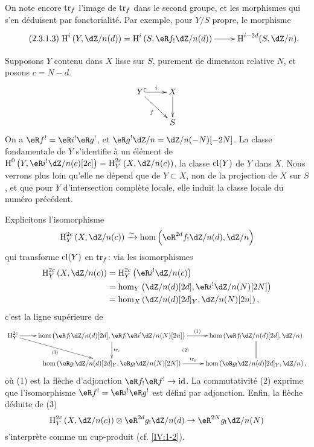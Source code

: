 On note encore $\operatorname{tr}_f$ l'image de $\operatorname{tr}_f$ dans le second groupe, et les 
morphismes qui s'en déduisent par fonctorialité. Par exemple, pour $Y/S$ 
propre, le morphisme 
\begin{equation*}\tag{2.3.1.3}\label{IV:eq:2-3-1-3}
\xymatrix{
  \h^i\left(Y,\dZ/n(d)\right) = \h^i\left(S,\eR f_!\dZ/n(d)\right) \ar[r] 
    & \h^{i-2 d}(S,\dZ/n) \text{.}
}
\end{equation*}

Supposons $Y$ contenu dans $X$ lisse sur $S$, purement de dimension relative 
$N$, et posons $c=N-d$. 
\[\xymatrix{
  Y \ar@{^{(}->}[r]^-i \ar[dr]_-f 
    & X \ar[d] \\
  & S
}\]
On a $\eR f^! = \eR i^!\eR g^!$, et $\eR g^! \dZ/n=\dZ/n(-N)[-2 N]$. La classe 
fondamentale de $Y$ s'identifie à un élément de 
$\h^0\left(Y,\eR i^!\dZ/n(c)[2 c]\right)=\h_Y^{2 c}\left(X,\dZ/n(c)\right)$, la 
classe $\operatorname{cl}(Y)$ de $Y$ dans $X$. Nous verrons plus loin qu'elle ne dépend que 
de $Y\subset X$, non de la projection de $X$ sur $S$, et que pour $Y$ 
d'intersection complète locale, elle induit la classe locale du numéro 
précédent. 

Explicitons l'isomorphisme 
\[
  \h_Y^{2 c}\left(X,\dZ/n(c)\right) \iso \hom\left(\eR^{2 d}f_!\dZ/n(d),\dZ/n\right)
\]
qui transforme $\operatorname{cl}(Y)$ en $\operatorname{tr}_f$: via les isomorphismes 
\begin{align*}
  \h_Y^{2 c}\left(X,\dZ/n(c)\right) 
    &= \h_Y^{2 c}\left(\eR i^!\dZ/n(c)\right) \\
    &= \hom_Y\left(\dZ/n(d)[2 d],\eR i^!\dZ/n(N)[2 N]\right) \\
    &= \hom_X\left(\dZ/n(d)[2 d]_Y,\dZ/n(N)[2 n]\right) \text{,}
\end{align*}
c'est la ligne supérieure de 
\[\xymatrix{
  \h_Y^{2 c} \ar[r] \ar[dr]_-{(3)} 
    & \hom\left(\eR f_!\dZ/n(d)[2 d],\eR f_! \eR i^!\dZ/n(N)[2 n]\right) \ar[r]^-{(1)} \ar[d]^-{\tr_i} \ar@{}[dr]|-{(2)}
    & \hom\left(\eR f_!\dZ/n(d)[2d],\dZ/n\right) \ar@{=}[d] \\
  & \hom\left(\eR g_!\dZ/n(d)[2 d]_Y,\eR g_!\dZ/n(N)[2 N]\right) \ar[r]^-{\tr_g} 
    & \hom\left(\eR g_!\dZ/n(d)[2 d]_Y,\dZ/n\right) \text{,}
}\]
où (1) est la flèche d'adjonction $\eR f_!\eR f^!\to \text{id}$. La 
commutativité (2) exprime que l'isomorphisme $\eR f^!=\eR i^!\eR g^!$ est 
défini par adjonction. Enfin, la flèche déduite de (3)
\[
  \h_Y^{2c}\left(X,\dZ/n(c)\right) \otimes \eR^{2 d} g_!\dZ/n(d) \to \eR^{2 N} g_!\dZ/n(N)
\]
s'interprète comme un cup-produit (cf. \ref{IV:1-2}). 





